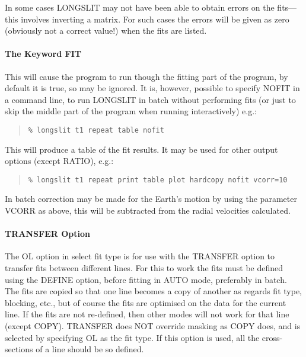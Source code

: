 In some cases LONGSLIT may not have been able to obtain errors on the
fits---this involves inverting a matrix.
For such cases the errors will be given as zero (obviously not a correct
value!) when the fits are listed.

\paragraph{The Keyword FIT}
\label{long.fit}

This will cause the program to run though the fitting part of the
program, by default it is true, so may be ignored. It is, however,
possible to specify NOFIT in a command line, to run LONGSLIT in batch
without performing fits (or just to skip the middle part of the program
when running interactively) e.g.:

\begin{quote}\begin{verbatim}
% longslit t1 repeat table nofit
\end{verbatim}\end{quote}

This will produce a table of the fit results.
It may be used for other output options (except RATIO), e.g.:

\begin{quote}\begin{verbatim}
% longslit t1 repeat print table plot hardcopy nofit vcorr=10
\end{verbatim}\end{quote}

In batch correction may be made for the Earth's motion by using the
parameter VCORR as above, this will be subtracted from the radial
velocities calculated.

\paragraph{TRANSFER Option}

The OL option in select fit type is for use with the TRANSFER option to
transfer fits between different lines. For this to work the fits must
be defined using the DEFINE option, before fitting in AUTO mode,
preferably in batch. The fits are copied so that one line becomes a
copy of another as regards fit type, blocking, etc., but of course the
fits are optimised on the data for the current line. If the fits are
not re-defined, then other modes will not work for that line (except
COPY). TRANSFER does NOT override masking as COPY does, and is selected
by specifying OL as the fit type.
If this option is used, all the cross-sections of a line should be so
defined.

